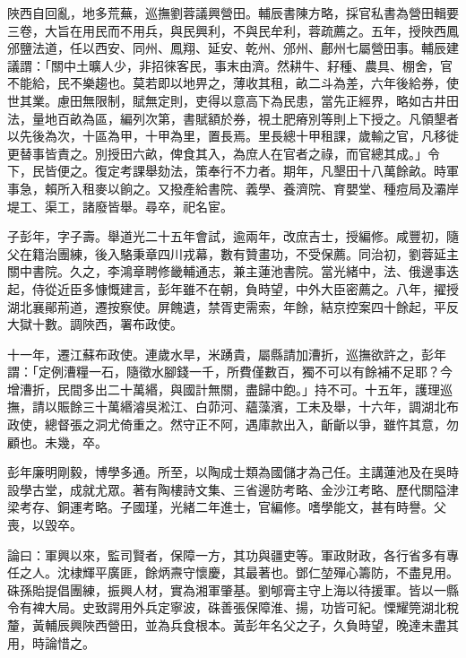 \begin{pinyinscope}
陜西自回亂，地多荒蕪，巡撫劉蓉議興營田。輔辰書陳方略，採官私書為營田輯要三卷，大旨在用民而不用兵，與民興利，不與民牟利，蓉疏薦之。五年，授陜西鳳邠鹽法道，任以西安、同州、鳳翔、延安、乾州、邠州、鄜州七屬營田事。輔辰建議謂：「關中土曠人少，非招徠客民，事末由濟。然耕牛、耔種、農具、棚舍，官不能給，民不樂趨也。莫若即以地畀之，薄收其租，畝二斗為差，六年後給券，使世其業。慮田無限制，賦無定則，吏得以意高下為民患，當先正經界，略如古井田法，量地百畝為區，編列次第，書賦額於券，視土肥瘠別等則上下授之。凡領墾者以先後為次，十區為甲，十甲為里，置長焉。里長總十甲租課，歲輸之官，凡移徙更替事皆責之。別授田六畝，俾食其入，為庶人在官者之祿，而官總其成。」令下，民皆便之。復定考課舉劾法，策奉行不力者。期年，凡墾田十八萬餘畝。時軍事急，賴所入租麥以餉之。又撥產給書院、義學、養濟院、育嬰堂、種痘局及灞岸堤工、渠工，諸廢皆舉。尋卒，祀名宦。

子彭年，字子壽。舉道光二十五年會試，逾兩年，改庶吉士，授編修。咸豐初，隨父在籍治團練，後入駱秉章四川戎幕，數有贊畫功，不受保薦。同治初，劉蓉延主關中書院。久之，李鴻章聘修畿輔通志，兼主蓮池書院。當光緒中，法、俄邊事迭起，侍從近臣多慷慨建言，彭年雖不在朝，負時望，中外大臣密薦之。八年，擢授湖北襄鄖荊道，遷按察使。屏餽遺，禁胥吏需索，年餘，結京控案四十餘起，平反大獄十數。調陜西，署布政使。

十一年，遷江蘇布政使。連歲水旱，米踴貴，屬縣請加漕折，巡撫欲許之，彭年謂：「定例漕糧一石，隨徵水腳錢一千，所費僅數百，獨不可以有餘補不足耶？今增漕折，民間多出二十萬緡，與國計無關，盡歸中飽。」持不可。十五年，護理巡撫，請以賑餘三十萬緡濬吳淞江、白茆河、蘊藻濱，工未及舉，十六年，調湖北布政使，總督張之洞尤倚重之。然守正不阿，遇庫款出入，齗齗以爭，雖忤其意，勿顧也。未幾，卒。

彭年廉明剛毅，博學多通。所至，以陶成士類為國儲才為己任。主講蓮池及在吳時設學古堂，成就尤眾。著有陶樓詩文集、三省邊防考略、金沙江考略、歷代關隘津梁考存、銅運考略。子國瑾，光緒二年進士，官編修。嗜學能文，甚有時譽。父喪，以毀卒。

論曰：軍興以來，監司賢者，保障一方，其功與疆吏等。軍政財政，各行省多有專任之人。沈棣輝平廣匪，餘炳燾守懷慶，其最著也。鄧仁堃殫心籌防，不盡見用。硃孫貽提倡團練，振興人材，實為湘軍肇基。劉郇膏主守上海以待援軍。皆以一縣令有裨大局。史致諤用外兵定寧波，硃善張保障淮、揚，功皆可紀。慄耀筦湖北稅釐，黃輔辰興陜西營田，並為兵食根本。黃彭年名父之子，久負時望，晚達未盡其用，時論惜之。


\end{pinyinscope}